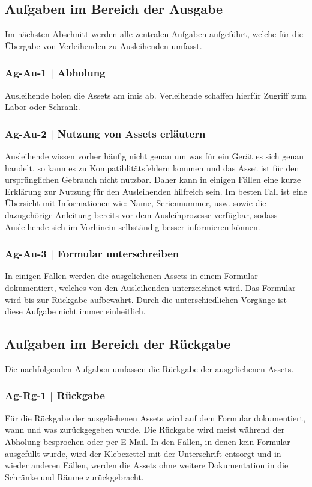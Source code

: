 \subsection{Aufgaben im Bereich der Ausgabe}
Im nächsten Abschnitt werden alle zentralen Aufgaben aufgeführt, welche für die Übergabe von
Verleihenden zu Ausleihenden umfasst.
\subsubsection{Ag-Au-1 | Abholung}
Ausleihende holen die Assets am \ac{imis} ab. Verleihende schaffen hierfür Zugriff zum Labor oder
Schrank. 
\subsubsection{Ag-Au-2 | Nutzung von Assets erläutern}
Ausleihende wissen vorher häufig nicht genau um was für ein Gerät es sich genau handelt, so kann es
zu Kompatiblitätsfehlern kommen und das Asset ist für den ursprünglichen Gebrauch nicht nutzbar.
Daher kann in einigen Fällen eine kurze Erklärung zur Nutzung für den Ausleihenden hilfreich sein.
Im besten Fall ist eine Übersicht mit Informationen wie: Name, Seriennummer, usw. sowie die
dazugehörige Anleitung bereits vor dem Ausleihprozesse verfügbar, sodass Ausleihende sich im
Vorhinein selbständig besser informieren können.
\subsubsection{Ag-Au-3 | Formular unterschreiben}
In einigen Fällen werden die ausgeliehenen Assets in einem Formular dokumentiert, welches von den
Ausleihenden unterzeichnet wird. Das Formular wird bis zur Rückgabe aufbewahrt. Durch die
unterschiedlichen Vorgänge ist diese Aufgabe nicht immer einheitlich.

\subsection{Aufgaben im Bereich der Rückgabe}
Die nachfolgenden Aufgaben umfassen die Rückgabe der ausgeliehenen Assets. 

\subsubsection{Ag-Rg-1 | Rückgabe}
Für die Rückgabe der ausgeliehenen Assets wird auf dem Formular dokumentiert, wann und was
zurückgegeben wurde. Die Rückgabe wird meist während der Abholung besprochen oder per E-Mail. In den
Fällen, in denen kein Formular ausgefüllt wurde, wird der Klebezettel mit der Unterschrift entsorgt
und in wieder anderen Fällen, werden die Assets ohne weitere Dokumentation in die Schränke und Räume
zurückgebracht.
